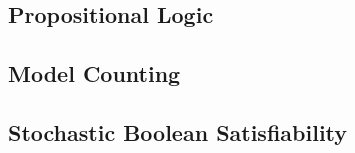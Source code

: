 \subsection{Propositional Logic}

\subsection{Model Counting}

\subsection{Stochastic Boolean Satisfiability}
